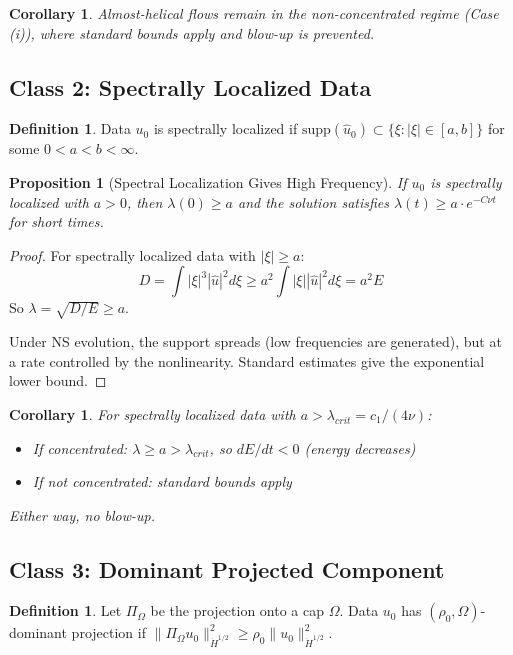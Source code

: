 \documentclass[11pt]{article}
\newtheorem{proposition}[theorem]{Proposition}
\newtheorem{corollary}[theorem]{Corollary}
\theoremstyle{definition}
\newtheorem{definition}[theorem]{Definition}
\begin{document}
\begin{corollary}
Almost-helical flows remain in the non-concentrated regime (Case (i)), where standard bounds apply and blow-up is prevented.
\end{corollary}

\subsection{Class 2: Spectrally Localized Data}

\begin{definition}
Data $u_0$ is spectrally localized if $\text{supp}(\hat{u}_0) \subset \{\xi : |\xi| \in [a, b]\}$ for some $0 < a < b < \infty$.
\end{definition}

\begin{proposition}[Spectral Localization Gives High Frequency]\label{prop:spectral}
If $u_0$ is spectrally localized with $a > 0$, then $\lambda(0) \geq a$ and the solution satisfies $\lambda(t) \geq a \cdot e^{-C\nu t}$ for short times.
\end{proposition}

\begin{proof}
For spectrally localized data with $|\xi| \geq a$:
\[
D = \int |\xi|^3 |\hat{u}|^2 d\xi \geq a^2 \int |\xi| |\hat{u}|^2 d\xi = a^2 E
\]
So $\lambda = \sqrt{D/E} \geq a$.

Under NS evolution, the support spreads (low frequencies are generated), but at a rate controlled by the nonlinearity. Standard estimates give the exponential lower bound.
\end{proof}

\begin{corollary}
For spectrally localized data with $a > \lambda_{crit} = c_1/(4\nu)$:
\begin{itemize}
\item If concentrated: $\lambda \geq a > \lambda_{crit}$, so $dE/dt < 0$ (energy decreases)
\item If not concentrated: standard bounds apply
\end{itemize}
Either way, no blow-up.
\end{corollary}

\subsection{Class 3: Dominant Projected Component}

\begin{definition}
Let $\Pi_\Omega$ be the projection onto a cap $\Omega$. Data $u_0$ has $(\rho_0, \Omega)$-dominant projection if $\|\Pi_\Omega u_0\|_{\dot{H}^{1/2}}^2 \geq \rho_0 \|u_0\|_{\dot{H}^{1/2}}^2$.
\end{definition}
\end{document}
